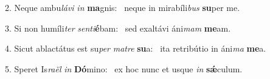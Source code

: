 2. Neque ambu\textit{lá}\textit{vi} \textit{in} \textbf{ma}gnis: \ast\  neque in mirabíli\textit{bus} \textbf{su}per me.\

3. Si non humíli\textit{ter} \textit{sen}\textit{ti}\textbf{é}bam: \ast\  sed exaltávi áni\textit{mam} \textbf{me}am.\

4. Sicut ablactátus est su\textit{per} \textit{ma}\textit{tre} \textbf{su}a: \ast\  ita retribútio in áni\textit{ma} \textbf{me}a.\

5. Speret Is\textit{ra}\textit{ël} \textit{in} \textbf{Dó}mino: \ast\  ex hoc nunc et usque \textit{in} \textbf{sǽ}culum.\

